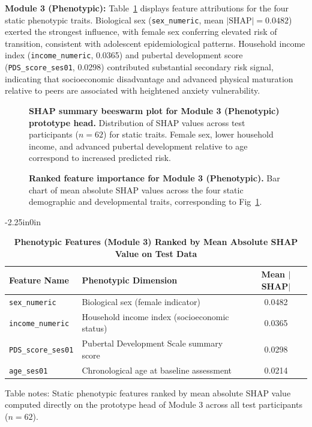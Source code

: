 \documentclass[10pt,letterpaper]{article}
\begin{document}
\textbf{Module 3 (Phenotypic):} Table~\ref{tab:module3_shap} displays feature attributions for the four static phenotypic traits. Biological sex (\texttt{sex\_numeric}, mean $|\mathrm{SHAP}| = 0.0482$) exerted the strongest influence, with female sex conferring elevated risk of transition, consistent with adolescent epidemiological patterns. Household income index (\texttt{income\_numeric}, 0.0365) and pubertal development score (\texttt{PDS\_score\_ses01}, 0.0298) contributed substantial secondary risk signal, indicating that socioeconomic disadvantage and advanced physical maturation relative to peers are associated with heightened anxiety vulnerability.

\begin{figure}[!h]
\caption{\textbf{SHAP summary beeswarm plot for Module 3 (Phenotypic) prototype head.}
Distribution of SHAP values across test participants ($n=62$) for static traits. Female sex, lower household income, and advanced pubertal development relative to age correspond to increased predicted risk.}
\label{fig:module3_shap_summary}
\end{figure}

\begin{figure}[!h]
\caption{\textbf{Ranked feature importance for Module 3 (Phenotypic).}
Bar chart of mean absolute SHAP values across the four static demographic and developmental traits, corresponding to Fig~\ref{fig:module3_shap_summary}.}
\label{fig:module3_bar}
\end{figure}

\begin{table}[!t]
\begin{adjustwidth}{-2.25in}{0in}
\centering
\caption{\textbf{Phenotypic Features (Module 3) Ranked by Mean Absolute SHAP Value on Test Data}}
\label{tab:module3_shap}
\footnotesize
\renewcommand{\arraystretch}{1.2}
\begin{tabular}{|l|l|c|}
\hline
\textbf{Feature Name} & \textbf{Phenotypic Dimension} & \textbf{Mean $|$SHAP$|$} \\
\hline
\texttt{sex\_numeric} & Biological sex (female indicator) & 0.0482 \\
\hline
\texttt{income\_numeric} & Household income index (socioeconomic status) & 0.0365 \\
\hline
\texttt{PDS\_score\_ses01} & Pubertal Development Scale summary score & 0.0298 \\
\hline
\texttt{age\_ses01} & Chronological age at baseline assessment & 0.0214 \\
\hline
\end{tabular}
\begin{flushleft}
Table notes: Static phenotypic features ranked by mean absolute SHAP value computed directly on the prototype head of Module 3 across all test participants ($n=62$).
\end{flushleft}
\end{adjustwidth}
\end{table}
\end{document}
